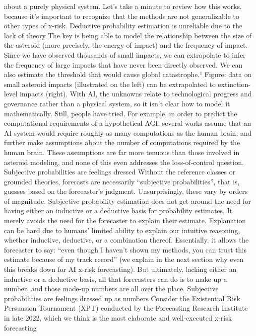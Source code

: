 about a purely physical system. Let’s take a minute to review how
this works, because it’s important to recognize that the methods are
not generalizable to other types of x-risk.
Deductive probability estimation is unreliable
due to the lack of theory
The key is being able to model the relationship between the size of
the asteroid (more precisely, the energy of impact) and the frequency
of impact. Since we have observed thousands of small impacts, we
can extrapolate to infer the frequency of large impacts that have
never been directly observed. We can also estimate the threshold
that would cause global catastrophe.¹
Figure: data on small asteroid impacts (illustrated on the
left) can be extrapolated to extinction-level impacts
(right).
With AI, the unknowns relate to technological progress and
governance rather than a physical system, so it isn’t clear how to
model it mathematically. Still, people have tried. For example, in
order to predict the computational requirements of a hypothetical AGI,
several works assume that an AI system would require roughly as
many computations as the human brain, and further make
assumptions about the number of computations required by the
human brain. These assumptions are far more tenuous than those
involved in asteroid modeling, and none of this even addresses the
loss-of-control question.
Subjective probabilities are feelings dressed
Without the reference classes or grounded theories, forecasts are
necessarily “subjective probabilities”, that is, guesses based on the
forecaster’s judgment. Unsurprisingly, these vary by orders of
magnitude.
Subjective probability estimation does not get around the need for
having either an inductive or a deductive basis for probability
estimates. It merely avoids the need for the forecaster to explain their
estimate. Explanation can be hard due to humans’ limited ability to
explain our intuitive reasoning, whether inductive, deductive, or a
combination thereof. Essentially, it allows the forecaster to say: “even
though I haven’t shown my methods, you can trust this estimate
because of my track record” (we explain in the next section why even
this breaks down for AI x-risk forecasting). But ultimately, lacking
either an inductive or a deductive basis, all that forecasters can do is
to make up a number, and those made-up numbers are all over the
place.
Subjective probabilities are feelings dressed
up as numbers
Consider the Existential Risk Persuasion Tournament (XPT)
conducted by the Forecasting Research Institute in late 2022, which
we think is the most elaborate and well-executed x-risk forecasting
